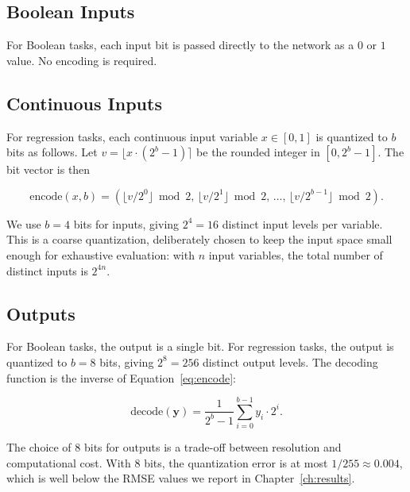 \subsection{Boolean Inputs}

For Boolean tasks, each input bit is passed directly to the network
as a $0$ or $1$ value. No encoding is required.

\subsection{Continuous Inputs}

For regression tasks, each continuous input variable $x \in [0, 1]$
is quantized to $b$ bits as follows. Let $v = \lfloor x \cdot (2^b - 1) \rceil$
be the rounded integer in $[0, 2^b - 1]$. The bit vector is then

\begin{equation}
  \text{encode}(x, b) = \left( \lfloor v / 2^0 \rfloor \bmod 2, \,
                            \lfloor v / 2^1 \rfloor \bmod 2, \,
                            \ldots, \,
                            \lfloor v / 2^{b-1} \rfloor \bmod 2 \right).
  \label{eq:encode}
\end{equation}

We use $b = 4$ bits for inputs, giving $2^4 = 16$ distinct input levels
per variable. This is a coarse quantization, deliberately chosen to
keep the input space small enough for exhaustive evaluation: with $n$
input variables, the total number of distinct inputs is $2^{4n}$.

\subsection{Outputs}

For Boolean tasks, the output is a single bit. For regression tasks,
the output is quantized to $b = 8$ bits, giving $2^8 = 256$ distinct
output levels. The decoding function is the inverse of Equation~\ref{eq:encode}:

\begin{equation}
  \text{decode}(\mathbf{y}) = \frac{1}{2^{b} - 1}
    \sum_{i=0}^{b-1} y_i \cdot 2^i.
  \label{eq:decode}
\end{equation}

The choice of $8$ bits for outputs is a trade-off between resolution
and computational cost. With $8$ bits, the quantization error is at
most $1/255 \approx 0.004$, which is well below the RMSE values we
report in Chapter~\ref{ch:results}.

